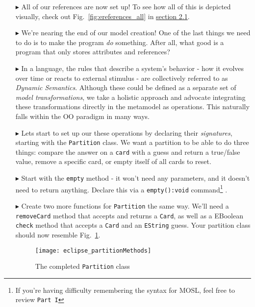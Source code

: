 \begin{itemize}
\item[$\blacktriangleright$] All of our references are now set up! To see how all of this is depicted visually, check out Fig.~\ref{fig:ereferences_all} in
\hyperlink{sec:static vis}{section 2.1}.

\pagebreak

\item[$\blacktriangleright$] We're nearing the end of our model creation! One of the last things we need to do is to make the program \emph{do} something. After
all, what good is a program that only stores attributes and references?

\item[$\blacktriangleright$] In a language, the rules that describe a system's behavior - how it evolves over time or reacts to external stimulus - are
collectively referred to as \emph{Dynamic Semantics}. Although these could be defined as a separate set of \emph{model
transformations}, we take a holistic approach and advocate integrating these transformations directly in the metamodel as operations. This naturally falls
within the OO paradigm in many ways.

\item[$\blacktriangleright$] Lets start to set up our these operations by declaring their \emph{signatures}, starting with the \texttt{Partition} class. We want
a partition to be able to do three things: compare the answer on a \texttt{card} with a guess and return a true/false value, remove a specific card, or empty
itself of all cards to reset.

\item[$\blacktriangleright$] Start with the \texttt{empty} method - it won't need any parameters, and it doesn't need to return anything. Declare this via a
\texttt{empty():void} command\footnote{If you're having difficulty remembering the syntax for MOSL, feel free to review \mbox{\texttt{Part I}}} .

\item[$\blacktriangleright$] Create two more functions for \texttt{Partition} the same way. We'll need a \texttt{removeCard} method that accepts and returns a
\texttt{Card}, as well as a EBoolean \texttt{check} method that accepts a \texttt{Card} and an \texttt{EString} guess. Your partition class should now resemble
Fig.~\ref{fig:partitionMethods}.

\begin{figure}[htbp]
	\centering
  \texttt{[image: eclipse\_partitionMethods]}
	\caption{The completed \texttt{Partition} class}
	\label{fig:partitionMethods}
\end{figure}


\end{itemize}
